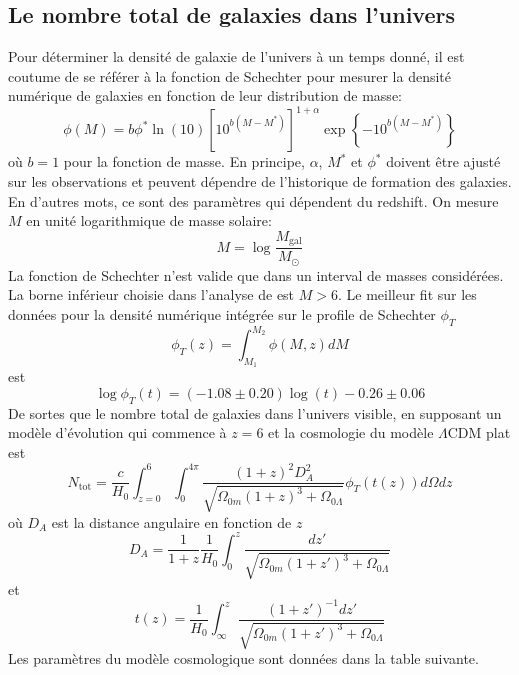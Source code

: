 \documentclass{article}
\numberwithin{equation}{section}
\begin{document}
\subsection{Le nombre total de galaxies dans l'univers}
Pour déterminer la densité de galaxie de l'univers à un temps donné, il est coutume de 
se référer à la fonction de Schechter pour mesurer la densité numérique de galaxies 
en fonction de leur distribution de masse:
\begin{equation}\label{eq:Schechter} 
        \phi(M) = b\phi^* \ln(10) \left[ 10^{b(M - M^{*})} \right]^{1 + \alpha} \exp \left\{ 
        -10^{b(M - M^{*})}\right\}
\end{equation} 
où $b=1$ pour la fonction de masse. En principe, $\alpha$, $M^{*}$ et $\phi^{*}$ doivent 
être ajusté sur les observations et peuvent dépendre de l'historique de formation 
des galaxies. En d'autres mots, ce sont des paramètres qui dépendent du redshift. On 
mesure $M$ en unité logarithmique de masse solaire:
\[
        M = \log \frac{M_{\text{gal}}}{M_\odot}
\]
La fonction de Schechter n'est valide que dans un interval de masses considérées. La borne 
inférieur choisie dans l'analyse de \cite{Conselice2016} est $M > 6$. Le meilleur fit sur les données 
pour la densité numérique intégrée sur le profile de Schechter $\phi_T$
\[
        \phi_T(z) = \int_{M_1}^{M_2} \phi(M, z) dM
\]
est \cite{Conselice2016}
\[
        \log \phi_T(t) = (-1.08 \pm 0.20) \log(t) - 0.26 \pm 0.06
\]
De sortes que le nombre total de galaxies dans l'univers visible, 
en supposant un modèle d'évolution
qui commence à $z = 6$ et la cosmologie du modèle $\Lambda \text{CDM}$ plat est
\begin{equation}\label{eq:NtotGal} 
        N_{\text{tot}} = \frac{c}{H_0} \int_{z=0}^{6} 
        \int_0^{4 \pi} \frac{(1 + z)^{2} D_A^{2}}{
        \sqrt{\Omega_{0m}(1 + z)^{3} + \Omega_{0\Lambda}}}
        \phi_T(t(z)) d\Omega dz
\end{equation} 
où $D_A$ est la distance angulaire en fonction de $z$
\begin{equation}\label{eq:DA} 
        D_A = \frac{1}{1 + z} \frac{1}{H_0}\int_0^{z} \frac{dz'}{\sqrt{\Omega_{0m}(1 + z')^{3} 
        + \Omega_{0\Lambda}}}
\end{equation} 
et
\begin{equation}\label{eq:t(z)} 
        t(z) = \frac{1}{H_0}\int_\infty^{z} \frac{(1 + z')^{-1} dz'}{
        \sqrt{\Omega_{0m}(1 + z')^{3} + \Omega_{0\Lambda}}}
\end{equation} 
Les paramètres du modèle cosmologique sont données dans la table suivante.
\end{document}
